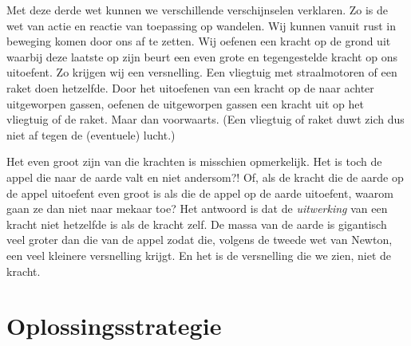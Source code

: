 Met deze derde wet kunnen we verschillende verschijnselen verklaren. Zo is de wet van actie en reactie van toepassing op wandelen. Wij kunnen vanuit rust in beweging komen door ons af te zetten. Wij oefenen een kracht op de grond uit waarbij deze laatste op zijn beurt een even grote en tegengestelde kracht op ons uitoefent. Zo krijgen wij een versnelling. Een vliegtuig met straalmotoren of een raket doen hetzelfde. Door het uitoefenen van een kracht op de naar achter uitgeworpen gassen, oefenen de uitgeworpen gassen een kracht uit op het vliegtuig of de raket. Maar dan voorwaarts. (Een vliegtuig of raket duwt zich dus niet af tegen de (eventuele) lucht.)

Het even groot zijn van die krachten is misschien opmerkelijk. Het is toch de appel die naar de aarde valt en niet andersom?! Of, als de kracht die de aarde op de appel uitoefent even groot is als die de appel op de aarde uitoefent, waarom gaan ze dan niet naar mekaar toe? Het antwoord is dat de \emph{uitwerking} van een kracht niet hetzelfde is als de kracht zelf. De massa van de aarde is gigantisch veel groter dan die van de appel zodat die, volgens de tweede wet van Newton, een veel kleinere versnelling krijgt. En het is de versnelling die we zien, niet de kracht.

\newpage

\section{Oplossingsstrategie}

